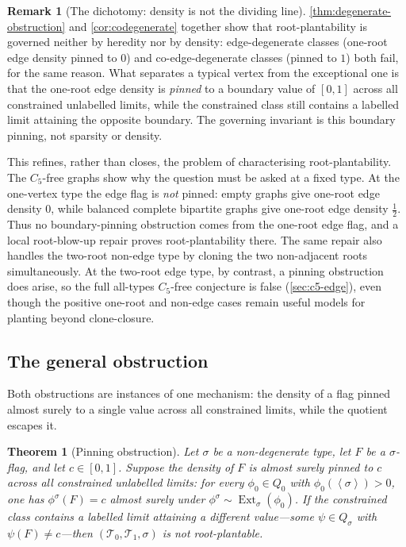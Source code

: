\documentclass[11pt]{article}
\newtheorem{theorem}{Theorem}
\theoremstyle{definition}
\newtheorem{remark}[remark]{Remark}
\newcommand{\T}{\mathcal{T}}
\newcommand{\Ext}{\operatorname{Ext}}
\newcommand{\brak}[1]{\left\langle #1\right\rangle}
\begin{document}
\begin{remark}[The dichotomy: density is not the dividing line]
\cref{thm:degenerate-obstruction} and \cref{cor:codegenerate}
together show that root-plantability is governed neither by heredity nor by density:
edge-degenerate classes (one-root edge density pinned to $0$) and co-edge-degenerate
classes (pinned to $1$) both fail, for the same reason.  What separates a typical
vertex from the exceptional one is that the one-root edge density is \emph{pinned} to a
boundary value of $[0,1]$ across all constrained unlabelled limits, while the
constrained class still contains a labelled limit attaining the opposite boundary.  The
governing invariant is this boundary pinning, not sparsity or density.

This refines, rather than closes, the problem of characterising root-plantability.
The $C_5$-free graphs show why the question must be asked at a fixed type.  At the
one-vertex type the edge flag is \emph{not} pinned: empty graphs give one-root edge
density $0$, while balanced complete bipartite graphs give one-root edge density
$\tfrac12$.  Thus no boundary-pinning obstruction comes from the one-root edge flag, and
a local root-blow-up repair proves root-plantability there.  The same repair also handles
the two-root non-edge type by cloning the two non-adjacent roots simultaneously.  At the
two-root edge type, by contrast, a pinning obstruction does arise, so the full all-types
$C_5$-free conjecture is false (\cref{sec:c5-edge}), even though the positive one-root and
non-edge cases remain useful models for planting beyond clone-closure.
\end{remark}

\subsection{The general obstruction}

Both obstructions are instances of one mechanism: the density of a flag pinned almost
surely to a single value across all constrained limits, while the quotient escapes
it.

\begin{theorem}[Pinning obstruction]\label{thm:pinning}
Let $\sigma$ be a non-degenerate type, let $F$ be a $\sigma$-flag, and let
$c\in[0,1]$.  Suppose the density of $F$ is almost surely pinned to $c$ across
all constrained unlabelled limits: for every $\phi_0\in Q_0$ with
$\phi_0(\brak\sigma)>0$, one has $\phi^\sigma(F)=c$ almost surely under
$\phi^\sigma \sim \Ext_\sigma(\phi_0)$.  If the constrained class contains a labelled limit attaining a different
value---some $\psi\in Q_\sigma$ with $\psi(F)\ne c$---then $(\T_0,\T_1,\sigma)$ is not
root-plantable.
\end{theorem}
\end{document}

